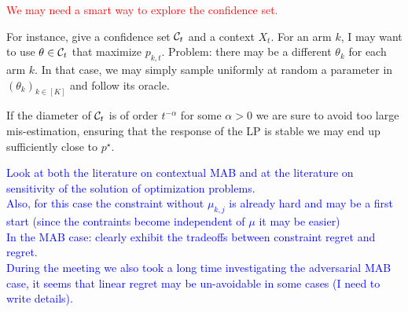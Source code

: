 \textcolor{red}{We may need a smart way to explore the confidence set.}

For instance, give a confidence set $\mathcal{C}_t$ and a context $X_t$. For an arm $k$, I may want to use $\theta \in \mathcal{C}_t$ that maximize $p_{k,t}$. Problem: there may be a different $\theta_k$ for each arm $k$. In that case, we may simply sample uniformly at random a parameter in $(\theta_k)_{k \in [K]}$ and follow its oracle.

If the diameter of $\mathcal{C}_t$ is of order $t^{-\alpha}$ for some $\alpha>0$ we are sure to avoid too large mis-estimation, ensuring that the response of the LP is stable we may end up sufficiently close to $p^\star$. 

\textcolor{blue}{Look at both the literature on contextual MAB and at the literature on sensitivity of the solution of optimization problems.\\
Also, for this case the constraint without $\mu_{k,j}$ is already hard and may be a first start (since the contraints become independent of $\mu$ it may be easier)\\
In the MAB case: clearly exhibit the tradeoffs between constraint regret and regret.\\
During the meeting we also took a long time investigating the adversarial MAB case, it seems that linear regret may be un-avoidable in some cases (I need to write details).}

